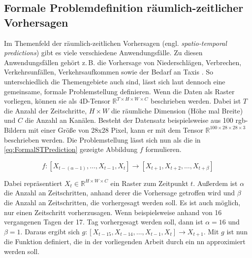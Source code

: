 \subsection{Formale Problemdefinition räumlich-zeitlicher Vorhersagen}
\label{sec:STPredictions}
Im Themenfeld der räumlich-zeitlichen Vorhersagen (engl. \emph{spatio-temporal predictions}) gibt es viele verschiedene Anwendungsfälle.
Zu diesen Anwendungsfällen gehört z.\,B. die Vorhersage von Niederschlägen, Verbrechen, Verkehrsunfällen, Verkehrsaufkommen sowie der Bedarf an Taxis \cite{ConvLSTM,CrimeConvLSTM,CrimeSTResNet,HeteroConvLSTM,TrafficVolumeGraphDCRNN,STResNetOriginal}.
So unterschiedlich die Themengebiete auch sind, lässt sich laut \cite{DLTraff} dennoch eine gemeinsame, formale Problemstellung definieren.
Wenn die Daten als Raster vorliegen, können sie als 4D-Tensor $\mathbb{R}^{T \times H \times W \times C}$ beschrieben werden.
Dabei ist $T$ die Anzahl der Zeitschritte, $H \times W$ die räumliche Dimension (Höhe mal Breite) und $C$ die Anzahl an Kanälen.
Besteht der Datensatz beispielsweise aus 100 \acrshort{rgb}-Bildern mit einer Größe von 28x28 Pixel, kann er mit dem Tensor $\mathbb{R}^{100 \times 28 \times 28 \times 3}$ beschrieben werden.
Die Problemstellung lässt sich nun als die in \autoref{eq:FormalSTPrediction} gezeigte Abbildung $f$ formulieren.

\begin{equation}
    f: [X_{t-(\alpha-1)}, \dots, X_{t-1}, X_t] \to [X_{t+1}, X_{t+2}, \dots, X_{t+\beta}]
\label{eq:FormalSTPrediction}
\end{equation}

Dabei repräsentiert $X_t \in \mathbb{R}^{H \times W \times C}$ ein Raster zum Zeitpunkt $t$.
Außerdem ist $\alpha$ die Anzahl an Zeitschritten, anhand derer die Vorhersage getroffen wird und $\beta$ die Anzahl an Zeitschritten, die vorhergesagt werden soll.
Es ist auch möglich, nur einen Zeitschritt vorherzusagen.
Wenn beispielsweise anhand von 16 vergangenen Tagen der 17. Tag vorhergesagt werden soll, dann ist $\alpha = 16$ und $\beta = 1$.
Daraus ergibt sich $g: [X_{t-15}, X_{t-14}, \dots, X_{t-1}, X_t] \to X_{t+1}$.
Mit $g$ ist nun die Funktion definiert, die in der vorliegenden Arbeit durch ein \acrshort{nn} approximiert werden soll.

